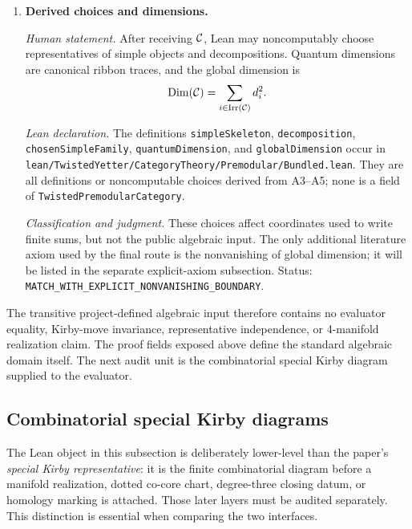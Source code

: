 \begin{enumerate}[label=\textbf{A\arabic*.},leftmargin=*]
\item \textbf{Derived choices and dimensions.}

\emph{Human statement.}
After receiving $\mathcal{C}$, Lean may noncomputably choose representatives of simple
objects and decompositions.  Quantum dimensions are canonical ribbon traces,
and the global dimension is
\[
 \operatorname{Dim}(\mathcal{C})
 =\sum_{i\in\operatorname{Irr}(\mathcal{C})} d_i^2.
\]

\emph{Lean declaration.}
The definitions \texttt{simpleSkeleton}, \texttt{decomposition},
\texttt{chosenSimpleFamily}, \texttt{quantumDimension}, and
\texttt{globalDimension} occur in
\nolinkurl{lean/TwistedYetter/CategoryTheory/Premodular/Bundled.lean}.  They are
all definitions or noncomputable choices derived from A3--A5; none is a field
of \texttt{TwistedPremodularCategory}.

\emph{Classification and judgment.}
These choices affect coordinates used to write finite sums, but not the
public algebraic input.  The only additional literature axiom used by the
final route is the nonvanishing of global dimension; it will be listed in the
separate explicit-axiom subsection.  Status:
\nolinkurl{MATCH_WITH_EXPLICIT_NONVANISHING_BOUNDARY}.

\end{enumerate}

The transitive project-defined algebraic input therefore contains no
evaluator equality, Kirby-move invariance, representative independence, or
4-manifold realization claim.  The proof fields exposed above define the
standard algebraic domain itself.  The next audit unit is the combinatorial
special Kirby diagram supplied to the evaluator.

\subsection{Combinatorial special Kirby diagrams}
\label{app:lean-kirby-diagram-input}

The Lean object in this subsection is deliberately lower-level than the
paper's \emph{special Kirby representative}: it is the finite combinatorial
diagram before a manifold realization, dotted co-core chart, degree-three
closing datum, or homology marking is attached.  Those later layers must be
audited separately.  This distinction is essential when comparing the two
interfaces.

